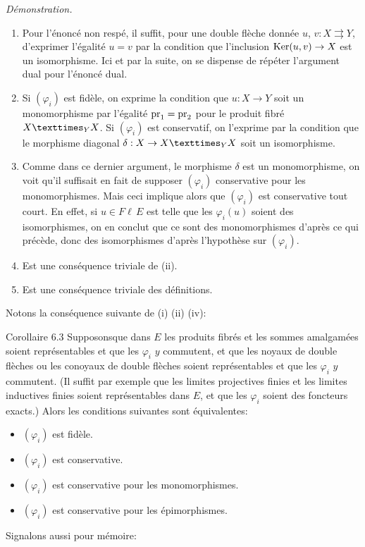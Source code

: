 \documentclass[10pt]{../fichiers-configuration-latex/smfart}
\def\labelenumi{(\theenumi)}
\begin{document}
\noindent \emph{Démonstration.}
\begin{enumerate}
\renewcommand{\theenumi}{\roman{enumi}}
\renewcommand{\labelenumi}{(\theenumi)}
\item Pour l'énoncé non respé, il suffit, pour une double
  flèche donnée $u$, $v:X\rightrightarrows Y$, d'exprimer
  l'égalité $u=v$ par la condition que l'inclusion
  $\operatorname{Ker}(u,v)\rightarrow X$ est un isomorphisme. Ici et par la suite,
  on se dispense de répéter l'argument dual pour l'énoncé
  dual.

\item Si $(\varphi_i)$ est fidèle, on exprime la condition que
  $u:X\rightarrow Y$ soit un monomorphisme par l'égalité
  $\operatorname{pr}_1=\operatorname{pr}_2$ pour le produit fibré $\fprod{X}{X}{Y}$. Si $(\varphi_i)$
  est conservatif, on l'exprime par la condition que le morphisme
  diagonal $\delta:X\rightarrow \fprod{X}{X}{Y}$ soit un isomorphisme.

\setcounter{enumi}{3}
\item Comme dans ce dernier argument, le morphisme $\delta$ est un
  monomorphisme, on voit qu'il suffisait en fait de supposer
  $(\varphi_i)$ conservative pour les monomorphismes. Mais ceci
  implique alors que $(\varphi_i)$ est conservative tout court. En
  effet, si $u\in %
F\ell\,E$ est telle que les $\varphi_i(u)$ soient des
  isomorphismes, on en conclut que ce sont des monomorphismes
  d'après ce qui précède, donc des isomorphismes d'après
  l'hypothèse sur $(\varphi_i)$.

\setcounter{enumi}{2}
\item Est une conséquence triviale de (ii).

\setcounter{enumi}{4}
\item Est une conséquence triviale des définitions.
\end{enumerate}

Notons la conséquence suivante de (i) (ii) (iv):

\begin{enonce*}{Corollaire 6.3}
Supposons\pageoriginale que dans $E$ les produits fibrés et les
sommes amalgamées soient représentables et que les $\varphi_i$ $y$
commutent, et que les noyaux de double flèches ou les conoyaux de
double flèches soient représentables et que les $\varphi_i$ $y$
commutent. (Il suffit par exemple que les limites projectives finies
et les limites inductives finies soient représentables dans $E$, et
que les $\varphi_i$ soient des foncteurs exacts.) Alors les
conditions suivantes sont équivalentes:
\begin{itemize}
\item[a)] $(\varphi_i)$ est fidèle.

\item[b)] $(\varphi_i)$ est conservative.

\item[c)] $(\varphi_i)$ est conservative pour les monomorphismes.

\item[${\rm c')}$] $(\varphi_i)$ est conservative pour les épimorphismes.
\end{itemize}
\end{enonce*}
Signalons aussi pour mémoire:
\end{document}
